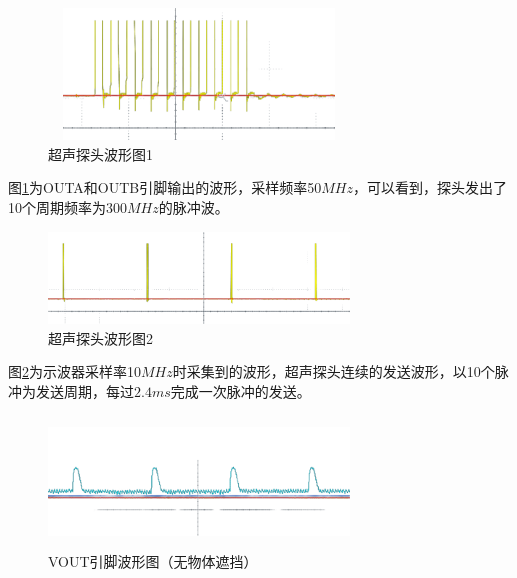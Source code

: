  \begin{figure}[!h]
	    \centering
	    \includegraphics[width=8cm,height=3.5cm]{figure/debug waveform3.png}
	    \caption{超声探头波形图1}
	    \label{超声探头波形图1}
	\end{figure}\par
 图\ref{超声探头波形图1}为OUTA和OUTB引脚输出的波形，采样频率50$MHz$，可以看到，探头发出了10个周期频率为300$MHz$的脉冲波。
  \begin{figure}[!h]
	    \centering
	    \includegraphics[width=8cm]{figure/debug waveform4.png}
	    \caption{超声探头波形图2}
	    \label{超声探头波形图2}
	\end{figure}\par
 图\ref{超声探头波形图2}为示波器采样率10$MHz$时采集到的波形，超声探头连续的发送波形，以10个脉冲为发送周期，每过$2.4ms$完成一次脉冲的发送。
 \newpage
 \begin{figure}[!h]
	    \centering
	    \includegraphics[width=8cm,height=3.5cm]{figure/debug waveform5.png}
	    \caption{VOUT引脚波形图（无物体遮挡）}
	    \label{VOUT引脚波形图（无物体遮挡）}
	\end{figure}\par

